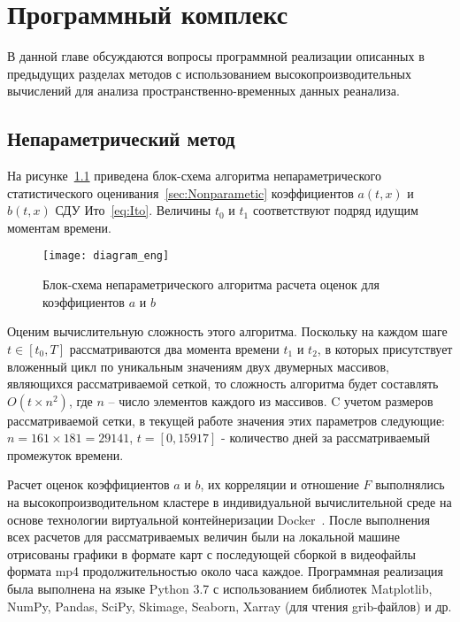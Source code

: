 \chapter{Программный комплекс}
\label{ch:Algorithms}
В данной главе обсуждаются вопросы программной реализации описанных в предыдущих разделах методов с использованием высокопроизводительных вычислений для анализа пространственно-временных данных реанализа.
\section{Непараметрический метод}
 На рисунке~\ref{fig:algo_nonparametric} приведена блок-схема алгоритма непараметрического статистического оценивания~\ref{sec:Nonparametic} коэффициентов $a(t,x)$ и $b(t,x)$ СДУ  Ито~\eqref{eq:Ito}. Величины $t_0$ и $t_1$ соответствуют подряд идущим моментам времени. 

\begin{figure}[!h]
	\centering
	\texttt{[image: diagram\_eng]}
	\caption{Блок-схема непараметрического алгоритма расчета оценок для коэффициентов $a$ и $b$} \label{fig:algo_nonparametric}
\end{figure}

Оценим вычислительную сложность этого алгоритма. Поскольку на каждом шаге $t \in [t_0,T]$ рассматриваются два момента времени $t_1$ и $t_2$, в которых присутствует вложенный цикл по уникальным значениям двух двумерных массивов, являющихся рассматриваемой сеткой, то сложность алгоритма будет составлять $O(t\times n^2)$, где $n$ – число элементов каждого из массивов. C учетом размеров рассматриваемой сетки, в текущей работе значения этих параметров следующие: $n=161\times181=29141$, $t = [0, 15917]$ - количество дней за рассматриваемый промежуток времени.

Расчет оценок коэффициентов $a$ и $b$, их корреляции и отношение $F$ выполнялись на высокопроизводительном кластере в индивидуальной вычислительной среде на основе технологии виртуальной контейнеризации Docker~\cite{peinl2016docker}. После выполнения всех расчетов для рассматриваемых величин были на локальной машине отрисованы графики в формате карт с последующей сборкой в видеофайлы формата mp4 продолжительностью около часа каждое.  
Программная реализация была выполнена на языке Python 3.7 с использованием библиотек Matplotlib, NumPy, Pandas, SciPy, Skimage, Seaborn, Xarray (для чтения grib-файлов) и др.

